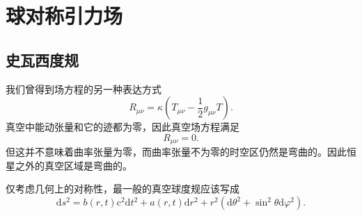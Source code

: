\documentclass[11pt, a4paper, oneside, onecolumn]{ctexart}
\numberwithin{equation}{subsection}
\begin{document}
\newpage
\section{球对称引力场}
\subsection{史瓦西度规}
我们曾得到场方程的另一种表达方式
\begin{equation}
R_{\mu\nu}=\kappa\left(T_{\mu\nu}-\frac12g_{\mu\nu}T\right).
\end{equation}
真空中能动张量和它的迹都为零，因此真空场方程满足
\begin{equation}
R_{\mu\nu}=0.
\end{equation}
但这并不意味着曲率张量为零，而曲率张量不为零的时空区仍然是弯曲的。因此恒星之外的真空区域是弯曲的。

仅考虑几何上的对称性，最一般的真空球度规应该写成
\begin{equation}
\mathrm{d}s^{2}=b\left(r,t\right)\mathrm{c}^{2}\mathrm{d}t^{2}+a\left(r,t\right)\mathrm{d}r^{2}+r^{2}\left(\mathrm{d}\theta^{2}+\sin^{2}\theta\mathrm{d}\varphi^{2}\right).
\end{equation}
\end{document}
